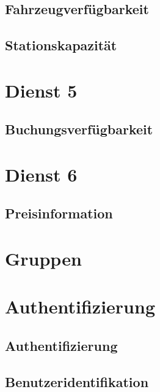 \subsection*{Fahrzeugverfügbarkeit}


\subsection*{Stationskapazität}



\section{Dienst 5}
\label{subsec:Datenmodell:Dienst5}

\subsection*{Buchungsverfügbarkeit}



\section{Dienst 6}
\label{subsec:Datenmodell:Dienst6}

\subsection*{Preisinformation}


\section{Gruppen}



\section{Authentifizierung}
\subsection*{Authentifizierung}


\subsection*{Benutzeridentifikation}


